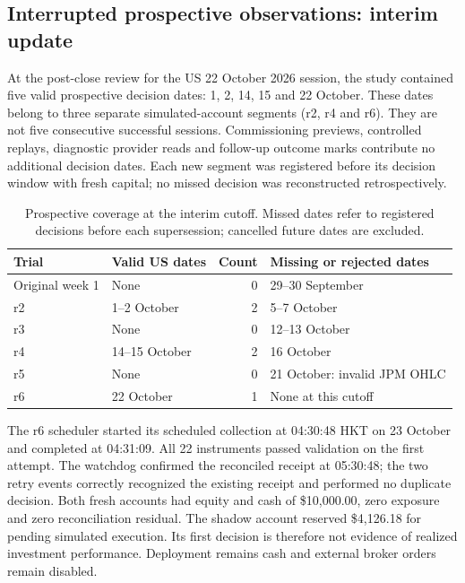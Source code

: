 \subsection{Interrupted prospective observations: interim update}
\label{sec:prospective-r6-interim}

At the post-close review for the US 22 October 2026 session, the study contained
five valid prospective decision dates: 1, 2, 14, 15 and 22 October. These dates
belong to three separate simulated-account segments (r2, r4 and r6). They are
not five consecutive successful sessions. Commissioning previews, controlled
replays, diagnostic provider reads and follow-up outcome marks contribute no
additional decision dates. Each new segment was registered before its decision
window with fresh capital; no missed decision was reconstructed retrospectively.

\begin{table}[htbp]
\centering\small
\caption{Prospective coverage at the interim cutoff. Missed dates refer to
registered decisions before each supersession; cancelled future dates are excluded.}
\label{tab:interrupted-coverage-r6}
\begin{tabular}{@{}lp{29mm}rp{43mm}@{}}
\toprule
Trial & Valid US dates & Count & Missing or rejected dates \\
\midrule
Original week 1 & None & 0 & 29--30 September \\
r2 & 1--2 October & 2 & 5--7 October \\
r3 & None & 0 & 12--13 October \\
r4 & 14--15 October & 2 & 16 October \\
r5 & None & 0 & 21 October: invalid JPM OHLC \\
r6 & 22 October & 1 & None at this cutoff \\
\bottomrule
\end{tabular}
\end{table}

The r6 scheduler started its scheduled collection at 04:30:48 HKT on
23 October and completed at 04:31:09. All 22 instruments passed validation on
the first attempt. The watchdog confirmed the reconciled receipt at 05:30:48;
the two retry events correctly recognized the existing receipt and performed
no duplicate decision. Both fresh accounts had equity and cash of
\$10,000.00, zero exposure and zero reconciliation residual. The shadow account
reserved \$4,126.18 for pending simulated execution. Its first decision is
therefore not evidence of realized investment performance. Deployment remains
cash and external broker orders remain disabled.

